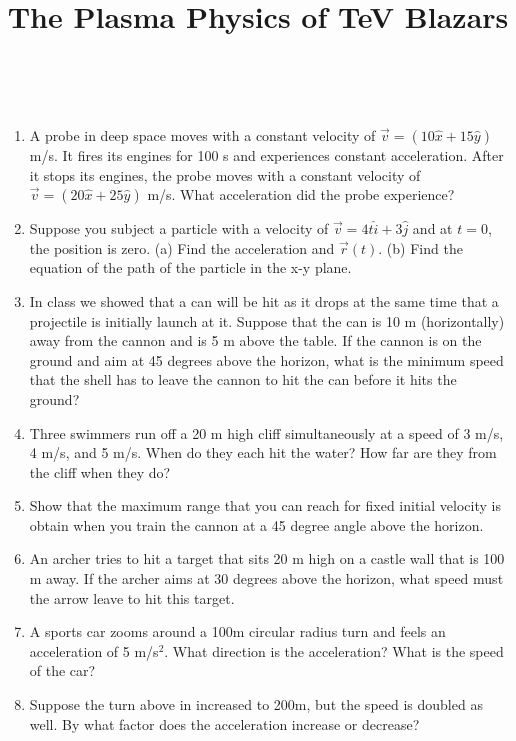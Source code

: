 \documentclass[12pt]{article}
\newcommand{\ihat}{\hat{i}}
\newcommand{\jhat}{\hat{j}}
\begin{document}
\title{The Plasma Physics of TeV Blazars}

\\
\bigskip
\begin{enumerate}

\item A probe in deep space moves with a constant velocity of $\vec{v} = (10
\hat{x} + 15 \hat{y} )$ m/s.  It fires its engines for 100 s and
experiences constant acceleration.  After it stops its engines, the
probe moves with a constant velocity of $\vec{v} = (20 \hat{x} + 25
\hat{y} )$ m/s.  What acceleration did the probe experience?

\item Suppose you subject a particle with a velocity of $\vec{v} = 4 t
  \ihat + 3 \jhat$ and at $t=0$, the position is zero. (a) Find the
  acceleration and $\vec{r}(t)$. (b) Find the equation of the path of
  the particle in the x-y plane.

\item In class we showed that a can will be hit as it drops at the
  same time that a projectile is initially launch at it.  Suppose that
  the can is 10 m (horizontally) away from the cannon and is 5 m above
  the table.  If the cannon is on the ground and aim at 45 degrees
  above the horizon, what is the minimum speed that the shell has to
  leave the cannon to hit the can before it hits the ground?

\item Three swimmers run off a 20 m high cliff simultaneously at a speed of 3 m/s, 4 m/s, and 5 m/s.  When do they each hit the water?  How far are they from the cliff when they do?

\item Show that the maximum range that you can reach for fixed initial
  velocity is obtain when you train the cannon at a 45 degree angle
  above the horizon.  

\item  An archer tries to hit a target that sits 20 m high on a castle
  wall that is 100 m away.  If the archer aims at 30 degrees above the
  horizon, what speed must the arrow leave to hit this target.

\item A sports car zooms around a 100m circular radius turn and feels
  an acceleration of 5 m/s$^2$.  What direction is the acceleration?
  What is the speed of the car?

\item Suppose the turn above in increased to 200m, but the speed is
  doubled as well.  By what factor does the acceleration increase or
  decrease? 

\end{enumerate}
\end{document}
